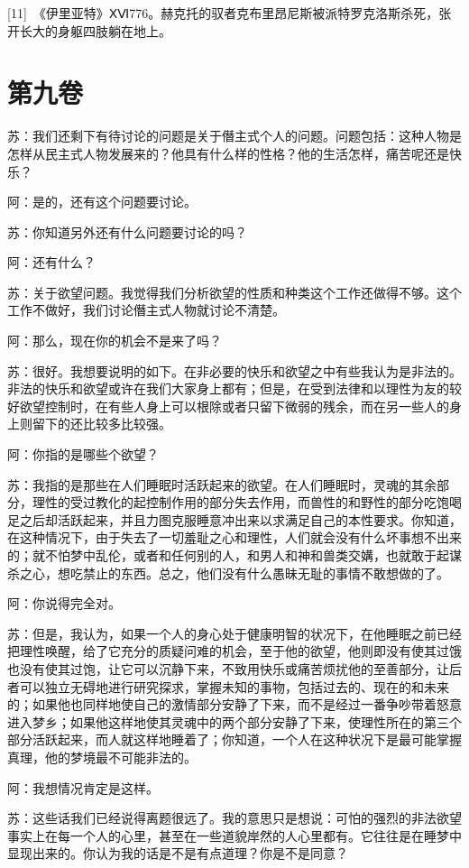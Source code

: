\documentclass[12pt,oneside]{book}
\begin{document}
[11]　《伊里亚特》ⅩⅥ776。赫克托的驭者克布里昂尼斯被派特罗克洛斯杀死，张开长大的身躯四肢躺在地上。





\chapter{第九卷}

苏：我们还剩下有待讨论的问题是关于僭主式个人的问题。问题包括：这种人物是怎样从民主式人物发展来的？他具有什么样的性格？他的生活怎样，痛苦呢还是快乐？

阿：是的，还有这个问题要讨论。

苏：你知道另外还有什么问题要讨论的吗？

阿：还有什么？

苏：关于欲望问题。我觉得我们分析欲望的性质和种类这个工作还做得不够。这个工作不做好，我们讨论僭主式人物就讨论不清楚。

阿：那么，现在你的机会不是来了吗？

苏：很好。我想要说明的如下。在非必要的快乐和欲望之中有些我认为是非法的。非法的快乐和欲望或许在我们大家身上都有；但是，在受到法律和以理性为友的较好欲望控制时，在有些人身上可以根除或者只留下微弱的残余，而在另一些人的身上则留下的还比较多比较强。

阿：你指的是哪些个欲望？

苏：我指的是那些在人们睡眠时活跃起来的欲望。在人们睡眠时，灵魂的其余部分，理性的受过教化的起控制作用的部分失去作用，而兽性的和野性的部分吃饱喝足之后却活跃起来，并且力图克服睡意冲出来以求满足自己的本性要求。你知道，在这种情况下，由于失去了一切羞耻之心和理性，人们就会没有什么坏事想不出来的；就不怕梦中乱伦，或者和任何别的人，和男人和神和兽类交媾，也就敢于起谋杀之心，想吃禁止的东西。总之，他们没有什么愚昧无耻的事情不敢想做的了。

阿：你说得完全对。

苏：但是，我认为，如果一个人的身心处于健康明智的状况下，在他睡眠之前已经把理性唤醒，给了它充分的质疑问难的机会，至于他的欲望，他则即没有使其过饿也没有使其过饱，让它可以沉静下来，不致用快乐或痛苦烦扰他的至善部分，让后者可以独立无碍地进行研究探求，掌握未知的事物，包括过去的、现在的和未来的；如果他也同样地使自己的激情部分安静了下来，而不是经过一番争吵带着怒意进入梦乡；如果他这样地使其灵魂中的两个部分安静了下来，使理性所在的第三个部分活跃起来，而人就这样地睡着了；你知道，一个人在这种状况下是最可能掌握真理，他的梦境最不可能非法的。

阿：我想情况肯定是这样。

苏：这些话我们已经说得离题很远了。我的意思只是想说：可怕的强烈的非法欲望事实上在每一个人的心里，甚至在一些道貌岸然的人心里都有。它往往是在睡梦中显现出来的。你认为我的话是不是有点道理？你是不是同意？
\end{document}
